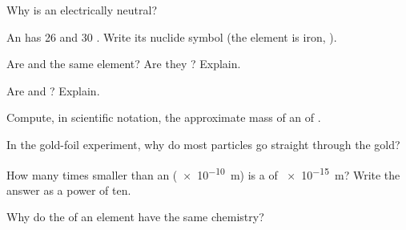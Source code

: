 \begin{exercise}[$\star$]\label{exo:g9:inside-the-atom:3}
Why is an  electrically neutral?
\end{exercise}

\begin{exercise}[$\star$]\label{exo:g9:inside-the-atom:4}
An  has 26  and 30 . Write its nuclide symbol (the
element is iron, ).
\end{exercise}

\begin{exercise}[$\star\star$]\label{exo:g9:inside-the-atom:5}
Are  and  the same element? Are they
? Explain.
\end{exercise}

\begin{exercise}[$\star\star$]\label{exo:g9:inside-the-atom:6}
Are  and  ? Explain.
\end{exercise}

\begin{exercise}[$\star\star$]\label{exo:g9:inside-the-atom:7}
Compute, in scientific notation, the approximate mass of an  of
.
\end{exercise}

\begin{exercise}[$\star\star$]\label{exo:g9:inside-the-atom:8}
In the gold-foil experiment, why do most particles go straight through
the gold?
\end{exercise}

\begin{exercise}[$\star\star$]\label{exo:g9:inside-the-atom:9}
How many times smaller than an  (\qty{e-10}{m}) is a  of
\qty{e-15}{m}? Write the answer as a power of ten.
\end{exercise}

\begin{exercise}[$\star\star$]\label{exo:g9:inside-the-atom:10}
Why do the  of an element have the same chemistry?
\end{exercise}

